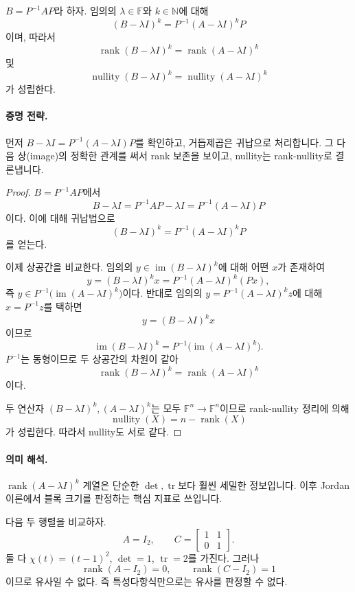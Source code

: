 \begin{theorem}
$B=P^{-1}AP$라 하자. 임의의 $\lambda\in\mathbb F$와 $k\in\mathbb N$에 대해
$$
(B-\lambda I)^k=P^{-1}(A-\lambda I)^kP
$$
이며, 따라서
$$
\operatorname{rank}(B-\lambda I)^k=\operatorname{rank}(A-\lambda I)^k
$$
및
$$
\operatorname{nullity}(B-\lambda I)^k=\operatorname{nullity}(A-\lambda I)^k
$$
가 성립한다.
\end{theorem}

\paragraph{증명 전략.}
먼저 $B-\lambda I=P^{-1}(A-\lambda I)P$를 확인하고, 거듭제곱은 귀납으로 처리합니다. 그 다음 상(image)의 정확한 관계를 써서 rank 보존을 보이고, nullity는 rank-nullity로 결론냅니다.

\begin{proof}
$B=P^{-1}AP$에서
$$
B-\lambda I=P^{-1}AP-\lambda I=P^{-1}(A-\lambda I)P
$$
이다. 이에 대해 귀납법으로
$$
(B-\lambda I)^k=P^{-1}(A-\lambda I)^kP
$$
를 얻는다.

이제 상공간을 비교한다. 임의의 $y\in\operatorname{im}(B-\lambda I)^k$에 대해 어떤 $x$가 존재하여
$$
y=(B-\lambda I)^k x=P^{-1}(A-\lambda I)^k(Px),
$$
즉 $y\in P^{-1}\!\big(\operatorname{im}(A-\lambda I)^k\big)$이다. 반대로 임의의
$y=P^{-1}(A-\lambda I)^k z$에 대해 $x=P^{-1}z$를 택하면
$$
y=(B-\lambda I)^k x
$$
이므로
$$
\operatorname{im}(B-\lambda I)^k
=
P^{-1}\!\big(\operatorname{im}(A-\lambda I)^k\big).
$$
$P^{-1}$는 동형이므로 두 상공간의 차원이 같아
$$
\operatorname{rank}(B-\lambda I)^k=\operatorname{rank}(A-\lambda I)^k
$$
이다.

두 연산자 $(B-\lambda I)^k,(A-\lambda I)^k$는 모두 $\mathbb F^n\to\mathbb F^n$이므로 rank-nullity 정리에 의해
$$
\operatorname{nullity}(X)=n-\operatorname{rank}(X)
$$
가 성립한다. 따라서 nullity도 서로 같다.
\end{proof}

\paragraph{의미 해석.}
$\operatorname{rank}(A-\lambda I)^k$ 계열은 단순한 $\det,\operatorname{tr}$보다 훨씬 세밀한 정보입니다. 이후 Jordan 이론에서 블록 크기를 판정하는 핵심 지표로 쓰입니다.

\begin{example}
다음 두 행렬을 비교하자.
$$
A=I_2,\qquad
C=\begin{bmatrix}1&1\\0&1\end{bmatrix}.
$$
둘 다 $\chi(t)=(t-1)^2$, $\det=1$, $\operatorname{tr}=2$를 가진다. 그러나
$$
\operatorname{rank}(A-I_2)=0,\qquad
\operatorname{rank}(C-I_2)=1
$$
이므로 유사일 수 없다. 즉 특성다항식만으로는 유사를 판정할 수 없다.
\end{example}


